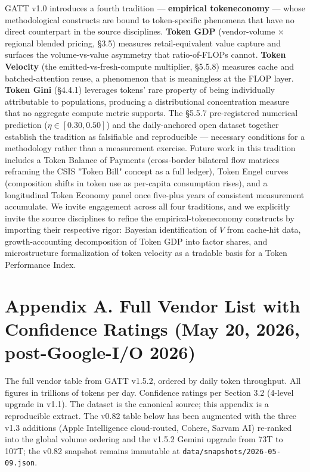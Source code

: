 \documentclass[11pt,a4paper]{article}
\begin{document}
GATT v1.0 introduces a fourth tradition --- \textbf{empirical tokeneconomy} --- whose methodological constructs are bound to token-specific phenomena that have no direct counterpart in the source disciplines. \textbf{Token GDP} (vendor-volume × regional blended pricing, §3.5) measures retail-equivalent value capture and surfaces the volume-vs-value asymmetry that ratio-of-FLOPs cannot. \textbf{Token Velocity} (the emitted-vs-fresh-compute multiplier, §5.5.8) measures cache and batched-attention reuse, a phenomenon that is meaningless at the FLOP layer. \textbf{Token Gini} (§4.4.1) leverages tokens' rare property of being individually attributable to populations, producing a distributional concentration measure that no aggregate compute metric supports. The §5.5.7 pre-registered numerical prediction ($\eta \in [0.30, 0.50]$) and the daily-anchored open dataset together establish the tradition as falsifiable and reproducible --- necessary conditions for a methodology rather than a measurement exercise. Future work in this tradition includes a Token Balance of Payments (cross-border bilateral flow matrices reframing the CSIS \cite{csis2026tokenbill} "Token Bill" concept as a full ledger), Token Engel curves (composition shifts in token use as per-capita consumption rises), and a longitudinal Token Economy panel once five-plus years of consistent measurement accumulate. We invite engagement across all four traditions, and we explicitly invite the source disciplines to refine the empirical-tokeneconomy constructs by importing their respective rigor: Bayesian identification of $V$ from cache-hit data, growth-accounting decomposition of Token GDP into factor shares, and microstructure formalization of token velocity as a tradable basis for a Token Performance Index.


\appendix

\section{Appendix A. Full Vendor List with Confidence Ratings (May 20, 2026, post-Google-I/O 2026)}

The full vendor table from GATT v1.5.2, ordered by daily token throughput. All figures in trillions of tokens per day. Confidence ratings per Section 3.2 (4-level upgrade in v1.1). The dataset is the canonical source; this appendix is a reproducible extract. The v0.82 table below has been augmented with the three v1.3 additions (Apple Intelligence cloud-routed, Cohere, Sarvam AI) re-ranked into the global volume ordering and the v1.5.2 Gemini upgrade from 73T to 107T; the v0.82 snapshot remains immutable at \texttt{data/snapshots/2026-05-09.json}.
\end{document}
